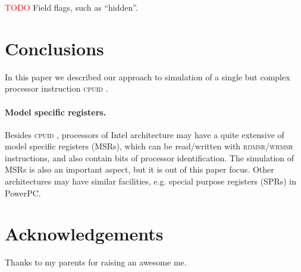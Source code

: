 \documentclass[a4paper,10pt,oneside,unicode]{article}
\newcommand{\cpuid}{\textsc{cpuid} }
\newcommand{\todo}[1][]{\textcolor{red}{TODO #1}}
\begin{document}
\todo Field flags, such as “hidden”.

\section{Conclusions}\label{sec:conclusions}

In this paper we described our approach to simulation of a single but complex processor instruction \cpuid. 

\paragraph{Model specific registers.} Besides \cpuid, processors of Intel architecture may have a quite extensive of model specific registers (MSRs), which can be read/written with \textsc{rdmsr/wrmsr} instructions, and also contain bits of processor identification. The simulation of MSRs is also an important aspect, but it is out of this paper focus. Other architectures may have similar facilities, e.g. special purpose registers (SPRs) in PowerPC. 

\section*{Acknowledgements}

Thanks to my parents for raising an awesome me.


\end{document}
